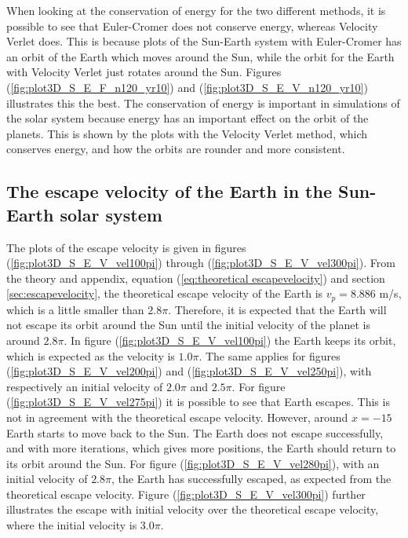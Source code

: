 \documentclass{article}
\begin{document}
    When looking at the conservation of energy for the two different methods, it is possible to see that Euler-Cromer does not conserve energy, whereas Velocity Verlet does. This is because plots of the Sun-Earth system with Euler-Cromer has an orbit of the Earth which moves around the Sun, while the orbit for the Earth with Velocity Verlet just rotates around the Sun. Figures (\ref{fig:plot3D_S_E_F_n120_yr10}) and (\ref{fig:plot3D_S_E_V_n120_yr10}) illustrates this the best. The conservation of energy is important in simulations of the solar system because energy has an important effect on the orbit of the planets. This is shown by the plots with the Velocity Verlet method, which conserves energy, and how the orbits are rounder and more consistent. \\


\subsection{The escape velocity of the Earth in the Sun-Earth solar system} \label{sec:escapevelocitySE}

    The plots of the escape velocity is given in figures (\ref{fig:plot3D_S_E_V_vel100pi}) through (\ref{fig:plot3D_S_E_V_vel300pi}).
    From the theory and appendix, equation (\ref{eq:theoretical escapevelocity}) and section \ref{sec:escapevelocity}, the theoretical escape velocity of the Earth is $v_p = 8.886$ m/s, which is a little smaller than $2.8 \pi$. Therefore, it is expected that the Earth will not escape its orbit around the Sun until the initial velocity of the planet is around $2.8 \pi$.
    In figure (\ref{fig:plot3D_S_E_V_vel100pi}) the Earth keeps its orbit, which is expected as the velocity is $1.0 \pi$.
    The same applies for figures (\ref{fig:plot3D_S_E_V_vel200pi}) and (\ref{fig:plot3D_S_E_V_vel250pi}), with respectively an initial velocity of $2.0 \pi$ and $2.5 \pi$.
    For figure (\ref{fig:plot3D_S_E_V_vel275pi}) it is possible to see that Earth escapes. This is not in agreement with the theoretical escape velocity.
    However, around $x = -15$ Earth starts to move back to the Sun. The Earth does not escape successfully, and with more iterations, which gives more positions, the Earth should return to its orbit around the Sun. For figure (\ref{fig:plot3D_S_E_V_vel280pi}), with an initial velocity of $2.8 \pi$, the Earth has successfully escaped, as expected from the theoretical escape velocity. Figure (\ref{fig:plot3D_S_E_V_vel300pi}) further illustrates the escape with initial velocity over the theoretical escape velocity, where the initial velocity is $3.0 \pi$. \\
\end{document}
